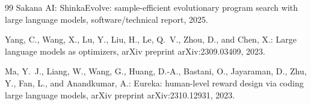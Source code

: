 \documentclass[11pt]{article}
\begin{document}
\begin{thebibliography}{99}
Sakana AI: ShinkaEvolve: sample-efficient evolutionary program search with large
language models, software/technical report, 2025.

Yang, C., Wang, X., Lu, Y., Liu, H., Le, Q.\ V., Zhou, D., and Chen, X.: Large language
models as optimizers, arXiv preprint arXiv:2309.03409, 2023.

Ma, Y.\ J., Liang, W., Wang, G., Huang, D.-A., Bastani, O., Jayaraman, D., Zhu, Y.,
Fan, L., and Anandkumar, A.: Eureka: human-level reward design via coding large language
models, arXiv preprint arXiv:2310.12931, 2023.
\end{thebibliography}
\end{document}
